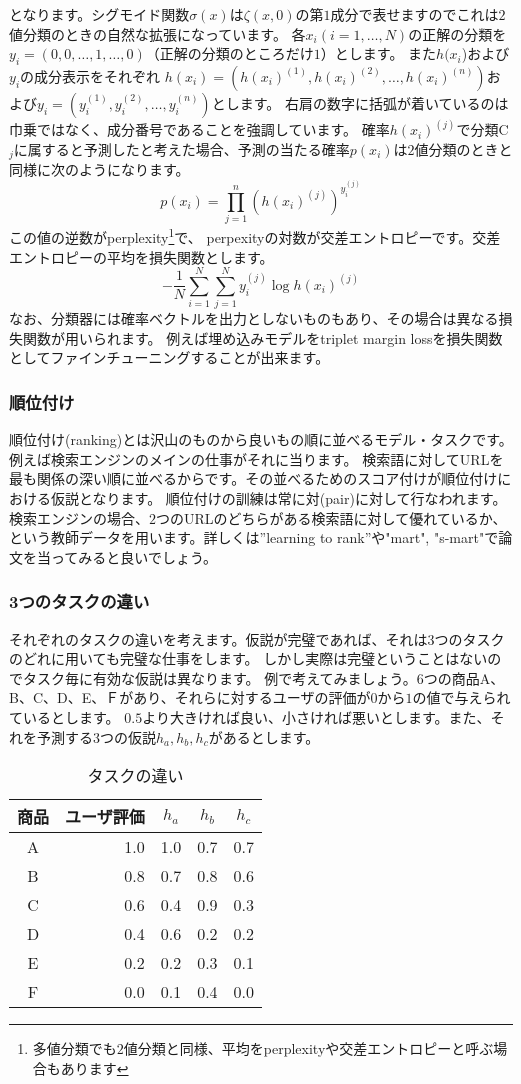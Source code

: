 \documentclass[a4j]{jarticle}
\begin{document}
となります。シグモイド関数$\sigma(x)$は$\zeta(x,0)$の第$1$成分で表せますのでこれは$2$値分類のときの自然な拡張になっています。
各$x_i  (i=1,\ldots,N)$の正解の分類を$y_i=(0,0,\ldots,1,\ldots,0)$（正解の分類のところだけ$1$）とします。
また$h(x_i$)および$y_i$の成分表示をそれぞれ
$h(x_i )=(h(x_i )^{(1)},h(x_i )^{(2)},\ldots,h(x_i )^{(n)})$および$y_i=(y_i^{(1)},y_i^{(2)},\ldots,y_i^{(n)})$とします。
右肩の数字に括弧が着いているのは巾乗ではなく、成分番号であることを強調しています。
確率$h(x_i)^{(j)}$で分類C$_j$に属すると予測したと考えた場合、予測の当たる確率$p(x_i)$は$2$値分類のときと同様に次のようになります。
$$ p(x_i) = \prod_{j=1}^n \left(h(x_i)^{(j)}\right)^{y_i^{(j)}}$$
この値の逆数がperplexity\footnote{多値分類でも$2$値分類と同様、平均をperplexityや交差エントロピーと呼ぶ場合もあります}で、
perpexityの対数が交差エントロピーです。交差エントロピーの平均を損失関数とします。
$$-\frac1N\sum_{i=1}^N\sum_{j=1}^N y_i^{(j)}\log h(x_i)^{(j)}$$
なお、分類器には確率ベクトルを出力としないものもあり、その場合は異なる損失関数が用いられます。
例えば埋め込みモデルをtriplet margin lossを損失関数としてファインチューニングすることが出来ます。

\subsubsection{順位付け}
順位付け(ranking)とは沢山のものから良いもの順に並べるモデル・タスクです。例えば検索エンジンのメインの仕事がそれに当ります。
検索語に対してURLを最も関係の深い順に並べるからです。その並べるためのスコア付けが順位付けにおける仮説となります。
順位付けの訓練は常に対(pair)に対して行なわれます。検索エンジンの場合、$2$つのURLのどちらがある検索語に対して優れているか、
という教師データを用います。詳しくは”learning to rank”や"mart", "s-mart"で論文を当ってみると良いでしょう。

\subsubsection{3つのタスクの違い}
それぞれのタスクの違いを考えます。仮説が完璧であれば、それは$3$つのタスクのどれに用いても完璧な仕事をします。
しかし実際は完璧ということはないのでタスク毎に有効な仮説は異なります。
例で考えてみましょう。$6$つの商品A、B、C、D、E、Ｆがあり、それらに対するユーザの評価が$0$から$1$の値で与えられているとします。
$0.5$より大きければ良い、小さければ悪いとします。また、それを予測する3つの仮説$h_a, h_b, h_c$があるとします。
\begin{table}[h]
  \centering
  \begin{tabular}{|c|r|c|c|c|}
  \hline 
  商品 & ユーザ評価 & $h_a$ & $h_b$ & $h_c$ \\
  \hline 
  A & 1.0 & 1.0 & 0.7 & 0.7 \\
  \hline 
  B & 0.8 & 0.7 & 0.8 & 0.6 \\
  \hline 
  C & 0.6 & 0.4 & 0.9 & 0.3 \\
  \hline 
  D & 0.4 & 0.6 & 0.2 & 0.2 \\
  \hline 
  E & 0.2 & 0.2 & 0.3 & 0.1 \\
  \hline 
  F & 0.0 & 0.1 & 0.4 & 0.0 \\
   \hline 
  \end{tabular}
  \caption{タスクの違い}
\end{table}
\end{document}
